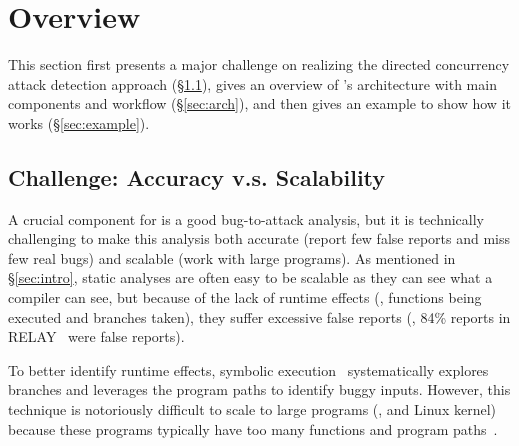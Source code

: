 
\section{\xxx Overview}\label{sec:overview}


This section first presents a major challenge on realizing the 
directed concurrency attack detection approach (\S\ref{sec:challenge}), gives an 
overview of \xxx's architecture with main components and workflow
(\S\ref{sec:arch}), and then  gives an example to show how it works 
(\S\ref{sec:example}).

\subsection{Challenge: Accuracy v.s. Scalability}\label{sec:challenge}

A crucial component for \xxx is a good bug-to-attack analysis, but it is 
technically challenging to make this analysis both accurate (report few false 
reports and miss few real bugs) and scalable (work with large programs). As 
mentioned in \S\ref{sec:intro}, static analyses are often easy to be scalable as 
they can see what a compiler can see, but because of the lack of runtime effects 
(\eg, functions being executed and branches taken), they suffer excessive 
false reports (\eg, 84\% reports in RELAY~\cite{relay:fse07} were false 
reports).


To better identify runtime effects, symbolic execution~\cite{klee:osdi08} 
systematically explores branches and leverages the program paths to identify 
buggy inputs. However, this technique is notoriously difficult to scale to large 
programs (\eg, \apache and Linux kernel) because these programs typically have 
too many functions and program paths~\cite{woodpecker:asplos13}.

